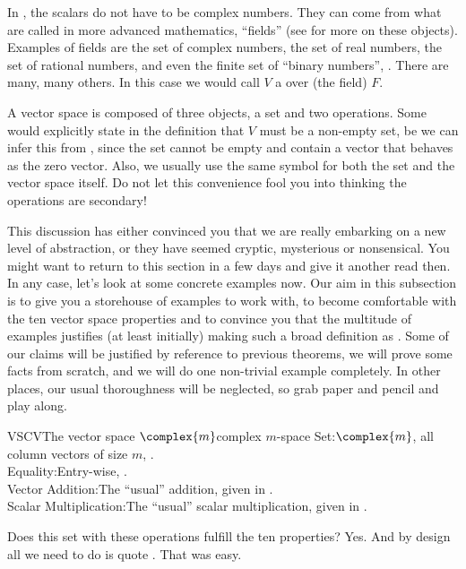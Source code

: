 %
In , the scalars do not have to be complex numbers.  They can come from what are called in more advanced mathematics, ``fields'' (see  for more on these objects).  Examples of fields are the set of complex numbers, the set of real numbers, the set of rational numbers, and even the finite set of ``binary numbers'', .  There are many, many others.  In this case we would call $V$ a  over (the field) $F$.\par
%
A vector space is composed of three objects, a set and two operations.  Some would explicitly state in the definition that $V$ must be a non-empty set, be we can infer this from , since the set cannot be empty and contain a vector that behaves as the zero vector.  Also, we usually use the same symbol for both the set and the vector space itself.  Do not let this convenience fool you into thinking the operations are secondary!\par
%
This discussion has either convinced you that we are really embarking on a new level of abstraction, or they have seemed cryptic, mysterious or nonsensical.  You might want to return to this section in a few days and give it another read then.  In any case, let's look at some concrete examples now.
%
%
Our aim in this subsection is to give you a storehouse of examples to work with, to become comfortable with the ten vector space properties and to convince you that the multitude of examples justifies (at least initially) making such a broad definition as .  Some of our claims will be justified by reference to previous theorems, we will prove some facts from scratch, and we will do one non-trivial example completely.  In other places, our usual thoroughness will be neglected, so grab paper and pencil and play along.
%
\begin{example}{VSCV}{The vector space $\complex{m}$}{complex $m$-space}
Set:\quad $\complex{m}$, all column vectors of size $m$, .\\
Equality:\quad Entry-wise, .\\
Vector Addition:\quad  The ``usual'' addition, given in .\\
Scalar Multiplication:\quad The ``usual'' scalar multiplication, given in .\par\medskip
%
Does this set with these operations fulfill the ten properties?  Yes.  And by design all we need to do is quote .  That was easy.
\end{example}

